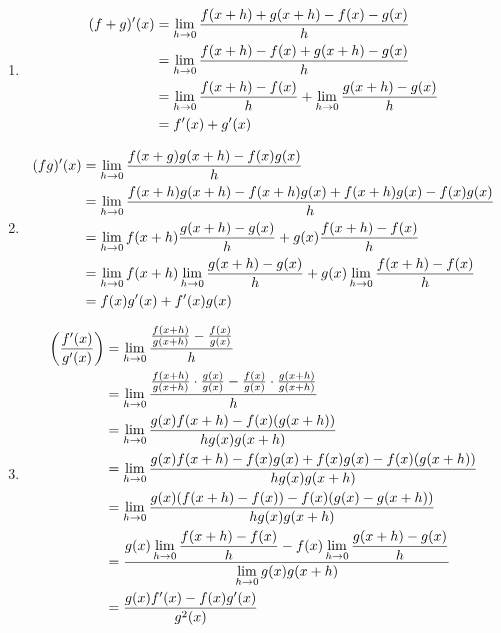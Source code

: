 \documentclass[12pt]{article}
\begin{document}
\begin{prf}{}
\begin{enumerate}
    \item 
    \begin{align*}
    (f+g)'(x) &= \displaystyle\lim_{h\to 0}\frac{f(x+h) + g(x + h) - f(x) - g(x)}{h}\\
    &= \displaystyle\lim_{h\to 0}\frac{f(x+h) - f(x) + g(x+h) - g(x)}{h}\\
    &= \displaystyle\lim_{h\to 0}\frac{f(x+h)-f(x)}{h} + \displaystyle\lim_{h\to 0}\frac{g(x+h) - g(x)}{h}\\
    &= f'(x) + g'(x)   
    \end{align*}
    \item 
    \begin{align*}
    (fg)'(x) &= \displaystyle\lim_{h\to 0}\frac{f(x+g)g(x+h) - f(x)g(x)}{h}\\
    &= \displaystyle\lim_{h\to 0}\frac{f(x+h)g(x+h) - f(x+h)g(x) + f(x+h)g(x) - f(x)g(x)}{h}\\
    &= \displaystyle\lim_{h\to 0}f(x+h)\frac{g(x+h) - g(x)}{h} + g(x)\frac{f(x+h) - f(x)}{h}\\
    &= \displaystyle\lim_{h\to 0}f(x+h)\displaystyle\lim_{h\to 0}\frac{g(x+h) - g(x)}{h} + g(x)\displaystyle\lim_{h\to 0}\frac{f(x+h) - f(x)}{h}\\
    &= f(x)g'(x) + f'(x)g(x)
    \end{align*}
    \item 
    \begin{align*}
    \left(\frac{f'(x)}{g'(x)}\right) &= \displaystyle\lim_{h\to 0}\frac{\frac{f(x+h)}{g(x+h)} - \frac{f(x)}{g(x)}}{h}\\
    &=  \displaystyle\lim_{h\to 0}\frac{\frac{f(x+h)}{g(x+h)}\cdot\frac{g(x)}{g(x)} - \frac{f(x)}{g(x)}\cdot\frac{g(x+h)}{g(x+h)}}{h}\\
    &= \displaystyle\lim_{h\to 0}\frac{g(x)f(x+h) - f(x)(g(x+h))}{hg(x)g(x+h)}\\
    &= \displaystyle\lim_{h\to 0}\frac{g(x)f(x+h) -f(x)g(x) + f(x)g(x) - f(x)(g(x+h))}{hg(x)g(x+h)}\\
    &= \displaystyle\lim_{h\to 0}\frac{g(x)(f(x+h) - f(x)) - f(x)(g(x) - g(x+h))}{hg(x)g(x+h)}\\  
    &= \frac{g(x)\displaystyle\lim_{h\to 0}\frac{f(x+h) - f(x)}{h} - f(x)\displaystyle\lim_{h\to 0}\frac{g(x+h) - g(x)}{h}}{\displaystyle\lim_{h\to 0}g(x)g(x+h)}\\
    &= \frac{g(x)f'(x) - f(x)g'(x)}{g^2(x)}
    \end{align*}
\end{enumerate}    
\end{prf}
\end{document}
